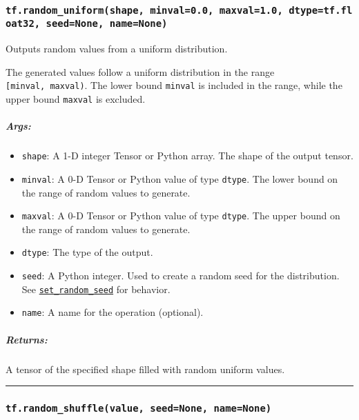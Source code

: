 \subsubsection{\texorpdfstring{\texttt{tf.random\_uniform(shape,\ minval=0.0,\ maxval=1.0,\ dtype=tf.float32,\ seed=None,\ name=None)}
}{tf.random\_uniform(shape, minval=0.0, maxval=1.0, dtype=tf.float32, seed=None, name=None) }}\label{tf.randomux5funiformshape-minval0.0-maxval1.0-dtypetf.float32-seednone-namenone}

Outputs random values from a uniform distribution.

The generated values follow a uniform distribution in the range
\texttt{{[}minval,\ maxval)}. The lower bound \texttt{minval} is
included in the range, while the upper bound \texttt{maxval} is
excluded.

\subparagraph{Args: }\label{args-10}

\begin{itemize}
\tightlist
\item
  \texttt{shape}: A 1-D integer Tensor or Python array. The shape of the
  output tensor.
\item
  \texttt{minval}: A 0-D Tensor or Python value of type \texttt{dtype}.
  The lower bound on the range of random values to generate.
\item
  \texttt{maxval}: A 0-D Tensor or Python value of type \texttt{dtype}.
  The upper bound on the range of random values to generate.
\item
  \texttt{dtype}: The type of the output.
\item
  \texttt{seed}: A Python integer. Used to create a random seed for the
  distribution. See
  \href{../../api_docs/python/constant_op.md\#set_random_seed}{\texttt{set\_random\_seed}}
  for behavior.
\item
  \texttt{name}: A name for the operation (optional).
\end{itemize}

\subparagraph{Returns: }\label{returns-10}

A tensor of the specified shape filled with random uniform values.

\begin{center}\rule{0.5\linewidth}{\linethickness}\end{center}

\subsubsection{\texorpdfstring{\texttt{tf.random\_shuffle(value,\ seed=None,\ name=None)}
}{tf.random\_shuffle(value, seed=None, name=None) }}\label{tf.randomux5fshufflevalue-seednone-namenone}

